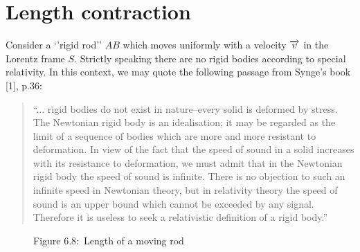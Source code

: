 \section{Length contraction}
Consider a `'rigid rod'' $AB$ 
which moves uniformly with a velocity $\overrightarrow{v}$ in 
the 
Lorentz frame $S$. Strictly speaking there are no 
rigid 
bodies according to special relativity.  In this 
context, we 
may quote 
the following passage from Synge's book [1], p.36:
\begin{quote}
``... rigid bodies do not exist in nature--every 
solid is deformed by stress. The Newtonian rigid body 
is 
an idealisation; it may be regarded as the limit of a 
sequence of bodies which are more and more resistant 
to 
deformation. In view of the fact that the speed of 
sound 
in a solid increases with its resistance to 
deformation, we 
must admit that in the Newtonian rigid body the speed 
of 
sound is infinite. There is no objection to such an 
infinite speed in Newtonian theory, but in relativity 
theory the speed of sound is an upper bound which 
cannot be 
exceeded by any signal. Therefore it is useless to seek 
a 
relativistic definition of a rigid body.''  
\end{quote}


\begin{figure}[H]
 \begin{center}
\caption*{Figure 6.8:~Length of a moving rod}\label{fig6.8}
\end{center}
\end{figure}

